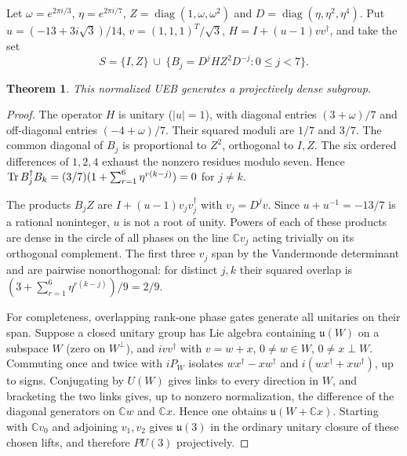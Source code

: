 \documentclass[10pt]{article}
\newtheorem{theorem}{Theorem}\newtheorem{lemma}[theorem]{Lemma}\newcommand{\C}{\mathbb C}
\begin{document}
Let $\omega=e^{2\pi i/3}$, $\eta=e^{2\pi i/7}$, $Z=\operatorname{diag}(1,\omega,\omega^2)$ and $D=\operatorname{diag}(\eta,\eta^2,\eta^4)$. Put $u=(-13+3i\sqrt3)/14$, $v=(1,1,1)^T/\sqrt3$, $H=I+(u-1)vv^\dagger$, and take the set
\[
          S=\{I,Z\}\ \cup\ \{B_j=D^j H Z^2 D^{-j}:0\le j<7\}.
\]
\begin{theorem}This normalized UEB generates a projectively dense subgroup.
\end{theorem}
\begin{proof}The operator $H$ is unitary ($|u|=1$), with diagonal entries $(3+\omega)/7$ and off-diagonal entries $(-4+\omega)/7$. Their squared moduli are $1/7$ and $3/7$. The common diagonal of $B_j$ is proportional to $Z^2$, orthogonal to $I,Z$. The six ordered differences of $1,2,4$ exhaust the nonzero residues modulo seven. Hence $\operatorname{Tr} B_j^\dagger B_k=(3/7)(1+\sum_{r=1}^6\eta^{r(k-j)})=0$ for $j\ne k$.

The products $B_j Z$ are $I+(u-1)v_jv_j^\dagger$ with $v_j=D^j v$. Since $u+u^{-1}=-13/7$ is a rational noninteger, $u$ is not a root of unity. Powers of each of these products are dense in the circle of all phases on the line $\C v_j$ acting trivially on its orthogonal complement. The first three $v_j$ span by the Vandermonde determinant and are pairwise nonorthogonal: for distinct $j,k$ their squared overlap is $(3+\sum_{r=1}^6\eta^{r(k-j)})/9=2/9$.

For completeness, overlapping rank-one phase gates generate all unitaries on their span. Suppose a closed unitary group has Lie algebra containing $\mathfrak u(W)$ on a subspace $W$ (zero on $W^\perp$), and $i vv^\dagger$ with $v=w+x$, $0\ne w\in W$, $0\ne x\perp W$. Commuting once and twice with $iP_W$ isolates $wx^\dagger-xw^\dagger$ and $i(wx^\dagger+xw^\dagger)$, up to signs. Conjugating by $U(W)$ gives links to every direction in $W$, and bracketing the two links gives, up to nonzero normalization, the difference of the diagonal generators on $\C w$ and $\C x$. Hence one obtains $\mathfrak u(W+\C x)$. Starting with $\C v_0$ and adjoining $v_1,v_2$ gives $\mathfrak u(3)$ in the ordinary unitary closure of these chosen lifts, and therefore $PU(3)$ projectively.
\end{proof}
\end{document}
